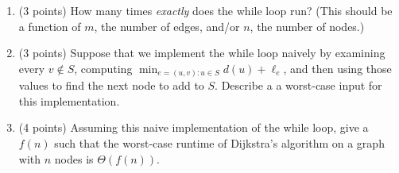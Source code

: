 \documentclass[11pt]{article}
\begin{document}
\begin{enumerate}
\begin{proof}
Inductive hypothesis (for this proof, use ``fewer nodes than'' for your
definition of ``smaller than''): \vspace{1in}

There are two cases to consider:
\begin{itemize}
    \item $G$ has 1 node. Then,
    \vspace{1.5in} 
    \item $G$ has $n > 1$ nodes. 
    \vspace{4in}

\end{itemize}

Since $G$ was an arbitrary DAG, and the claim holds in all cases, every DAG has a topological order.
\end{proof}

\newpage
\begin{center}
\LARGE\textbf{Section 4 (Greedy Graph Algorithms)\\}%
\end{center}


Recall Dijkstra's algorithm to compute the shortest path distance from one node $s$ to all other nodes in a directed graph with non-negative edge weights:

\begin{algo}
    Dijkstra(directed graph $G=(V, E)$ with non-negative edge weights; node $s$)\+\\
    Let $S$ be the set of explored nodes\\
    For each $u \in S$, we store a distance $d(u)$\\
    Initially $S = \{s\}$ and $d(s) = 0$\\
    While $S \neq V$:\+ \\
        Select a node $v \notin S$ with at least one edge from $S$ for which\\
        $d'(v) = \Min_{e=(u,v):u \in S} d(u) + \ell_e$ is as small as possible\\
        Add $v$ to $S$ and define $d(v) = d'(v)$\-
\end{algo}


\item (3 points) How many times \emph{exactly} does the while loop run? (This should be a function of $m$, the number of edges, and/or $n$, the number of nodes.)

\vspace{1in}

\item (3 points) Suppose that we implement the while loop naively by examining every $v \notin S$, computing $\min_{e = (u,v): u \in S} d(u) + \ell_e$, and then using those values to find the next node to add to $S$. Describe a a worst-case input for this implementation.

\vspace{2in}

\item (4 points) Assuming this naive implementation of the while loop, give a $f(n)$ such that the worst-case runtime of Dijkstra's algorithm on a graph with $n$ nodes is $\Theta(f(n))$.



\end{enumerate}

\end{document}
